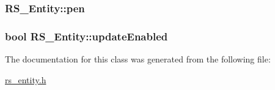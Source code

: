 \hypertarget{class_r_s___entity_a9651a97a17dda8a5d2706e50fcf8c6f7}{
\subsubsection[{pen}]{ R\-S\-\_\-\-Entity\-::pen\hspace{0.3cm}{\ttfamily [protected]}}}\label{class_r_s___entity_a9651a97a17dda8a5d2706e50fcf8c6f7}
\hypertarget{class_r_s___entity_a3136a9226397901cd8d642a9678ceff0}{
\subsubsection[{update\-Enabled}]{\setlength{\rightskip}{0pt plus 5cm}bool R\-S\-\_\-\-Entity\-::update\-Enabled\hspace{0.3cm}{\ttfamily [protected]}}}\label{class_r_s___entity_a3136a9226397901cd8d642a9678ceff0}


The documentation for this class was generated from the following file\-:\begin{DoxyCompactItemize}
\item 
\hyperlink{rs__entity_8h}{rs\-\_\-entity.\-h}\end{DoxyCompactItemize}
